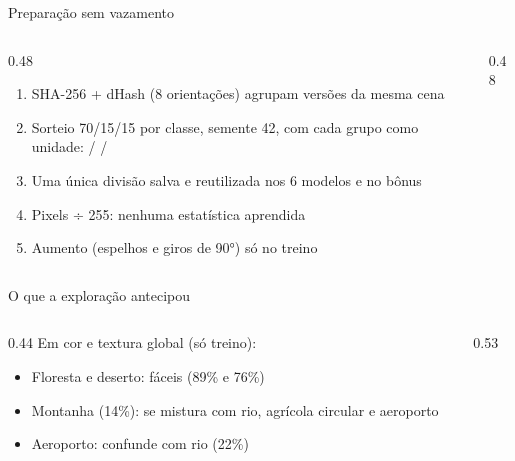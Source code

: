 \documentclass[aspectratio=169,10pt,t]{beamer}
\begin{document}
\begin{frame}{Preparação sem vazamento}
\begin{columns}[T]
\begin{column}{0.48\textwidth}
\begin{enumerate}
\item SHA-256 + dHash (8 orientações) agrupam versões da mesma cena
\item Sorteio 70/15/15 por classe, semente 42, com cada grupo como unidade:  /  / 
\item Uma única divisão salva e reutilizada nos 6 modelos e no bônus
\item Pixels ÷ 255: nenhuma estatística aprendida
\item Aumento (espelhos e giros de 90°) só no treino
\end{enumerate}
\end{column}
\begin{column}{0.48\textwidth}
\vskip3mm
\centering{}
\end{column}
\end{columns}
\end{frame}

\begin{frame}{O que a exploração antecipou}
\begin{columns}[T]
\begin{column}{0.44\textwidth}
Em cor e textura global (só treino):
\begin{itemize}
\item Floresta e deserto: fáceis (89\% e 76\%)
\item Montanha (14\%): se mistura com rio, agrícola circular e aeroporto
\item Aeroporto: confunde com rio (22\%)
\end{itemize}
\vskip2mm
\end{column}
\begin{column}{0.53\textwidth}
\centering{}
\end{column}
\end{columns}
\end{frame}
\end{document}
